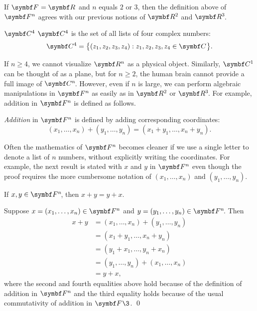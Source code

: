 If $\F{} = \R{}$ and $n$ equals $2$ or $3$, then the definition above of $\F{n}$ agrees with our previous notions of $\R{2}$
and $\RR{3}$.

\begin{example}{$\C{4}$}
$\C{4}$ is the set of all lists of four complex numbers:
\[
\C{4} = \br[\big]{ (z_1, z_2, z_3, z_4) : z_1, z_2, z_3, z_4 \in \C{} }.
\]
\exampledisplayend
\end{example}


If $n \ge 4$, we cannot visualize $\R{n}$ as a physical object.  Similarly, $\C{1}$ can be thought of as a
plane, but for \mbox{$n \ge 2$}, the human brain cannot provide a full image of
$\CC{n}$. However, even if $n$ is large, we can perform algebraic manipulations
in $\F{n}$ as easily as in $\R{2}$
or $\RR{3}$.  For example, addition in $\F{n}$ is defined as follows.

{\emph{Addition} in
$\F{n}$ is defined by adding corresponding coordinates:
\[
(x_1, \dots, x_n) + (y_1, \dots, y_n) = (x_1 + y_1, \dots, x_n + y_n).
\]}%

Often the mathematics of $\F{n}$ becomes cleaner if we use a
single letter to denote a list of $n$ numbers, without explicitly
writing the coordinates. For example, the next result is stated with $x$ and $y$ in $\F{n}$ even though the proof requires the more cumbersome notation of $(x_1, \dots, x_n)$ and $(y_1, \dots, y_n)$.

{If $x, y \in \FF{n}$, then $x + y = y + x$.}

\proof
Suppose $x = (x_1, \dots, x_n) \in \F n$ and $y = (y_1, \dots, y_n) \in \FF n$. Then
\begin{align*}
x + y &= (x_1, \dots, x_n) + (y_1, \dots, y_n )\\[6bp]
&= (x_1 + y_1, \dots, x_n + y_n) \\[6bp]
&= (y_1 + x_1, \dots, y_n + x_n) \\[6bp]
&= (y_1, \dots, y_n) + (x_1, \dots, x_n )\\[6bp]
&= y + x,
\end{align*}
where the second and fourth equalities above hold because of the definition of addition in $\F{n}$ and the third equality holds because of the usual commutativity of addition in $\F{}\3$.
\qed


